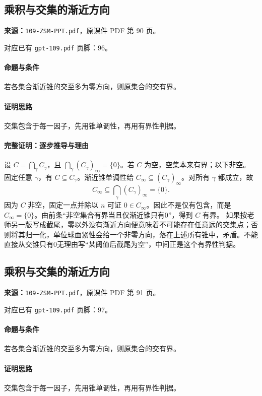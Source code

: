 \clearpage\subsection{乘积与交集的渐近方向}
\textbf{来源：}\texttt{109-ZSM-PPT.pdf}，原课件 PDF 第 90 页。\par
对应已有 \texttt{gpt-109.pdf} 页脚：96。\par
\paragraph{命题与条件}若各集合渐近锥的交至多为零方向，则原集合的交有界。
\paragraph{证明思路}交集包含于每一因子，先用锥单调性，再用有界性判据。
\paragraph{完整证明：逐步推导与理由}

设 $C=\bigcap_\gamma C_\gamma$，且 $\bigcap_\gamma(C_\gamma)_\infty=\{0\}$。若 $C$ 为空，空集本来有界；以下非空。
固定任意 $\gamma$，有 $C\subseteq C_\gamma$。渐近锥单调性给 $C_\infty\subseteq(C_\gamma)_\infty$。对所有 $\gamma$ 都成立，故
\[C_\infty\subseteq\bigcap_\gamma(C_\gamma)_\infty=\{0\}.\]
因为 $C$ 非空，固定一点并除以 $n$ 可证 $0\in C_\infty$。因此不是仅有包含，而是 $C_\infty=\{0\}$。由前条“非空集合有界当且仅渐近锥只有0”，得到 $C$ 有界。
如果按老师另一版写成截尾，零以外没有渐近方向便意味着不可能存在任意远的交集点；否则将其归一化，单位球面紧性会给一个非零方向，落在上述所有锥中，矛盾。不能直接从交锥只有0无理由写“某阈值后截尾为空”，中间正是这个有界性判据。

\clearpage\subsection{乘积与交集的渐近方向}
\textbf{来源：}\texttt{109-ZSM-PPT.pdf}，原课件 PDF 第 91 页。\par
对应已有 \texttt{gpt-109.pdf} 页脚：97。\par
\paragraph{命题与条件}若各集合渐近锥的交至多为零方向，则原集合的交有界。
\paragraph{证明思路}交集包含于每一因子，先用锥单调性，再用有界性判据。

